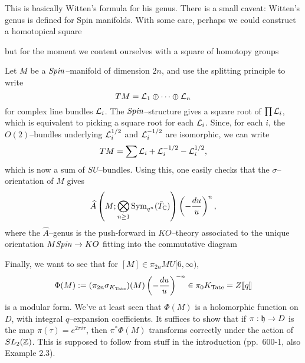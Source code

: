 This is basically Witten's formula for his genus.  There is a small caveat: Witten's genus is defined for Spin manifolds.  With some care, perhaps we could construct a homotopical square
\begin{center}
\end{center}
but for the moment we content ourselves with a square of homotopy groups
\begin{center}
\end{center}
Let $M$ be a $\mathit{Spin}$--manifold of dimension $2n$, and use the splitting principle to write \[TM = \mathcal{L}_1 \oplus \cdots \oplus \mathcal{L}_n\] for complex line bundles $\mathcal{L}_i$.  The $\mathit{Spin}$--structure gives a square root of $\prod \mathcal{L}_i$, which is equivalent to picking a square root for each $\mathcal{L}_i$.  Since, for each $i$, the $O(2)$--bundles underlying $\mathcal{L}_i^{1/2}$ and $\mathcal{L}_i^{-1/2}$ are isomorphic, we can write \[TM = \sum \mathcal{L}_i + \mathcal{L}_i^{-1/2} - \mathcal{L}_i^{1/2},\] which is now a sum of $SU$--bundles.  Using this, one easily checks that the $\sigma$--orientation of $M$ gives \[\widehat A \left(M; \bigotimes_{n \ge 1} \operatorname{Sym}_{q^n}(\bar T_{\mathbb{C}}) \right) \left(-\frac{du}{u}\right)^n,\] where the $\widehat A$--genus is the push-forward in $KO$--theory associated to the unique orientation $M\mathit{Spin} \to KO$ fitting into the commutative diagram
\begin{center}
\end{center}

Finally, we want to see that for $[M] \in \pi_{2n} MU[6, \infty)$, \[\Phi(M) := (\pi_{2n} \sigma_{K_{\mathrm{Tate}}})(M) \left( -\frac{du}{u} \right)^{-n} \in \pi_0 K_{\mathrm{Tate}} = Z\llbracket{q}\rrbracket\] is a modular form.  We've at least seen that $\Phi(M)$ is a holomorphic function on $D$, with integral $q$--expansion coefficients.  It suffices to show that if $\pi: \mathfrak h \to D$ is the map $\pi(\tau) = e^{2 \pi i \tau}$, then $\pi^* \Phi(M)$ transforms correctly under the action of $SL_2(\mathbb Z)$.  This is supposed to follow from stuff in the introduction (pp.\ 600-1, also Example 2.3).


